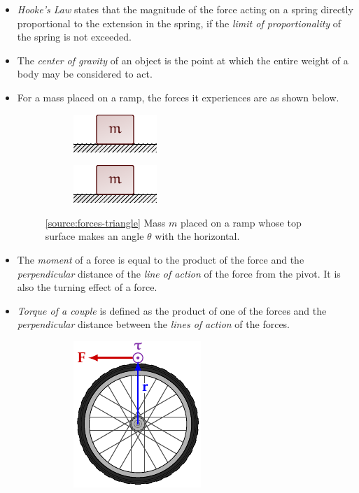 \documentclass[oneside]{book}
\begin{document}
\begin{itemize}
    \item \emph{Hooke's Law} states that the magnitude of the force acting on a spring directly proportional to the extension in the spring, if the \emph{limit of proportionality} of the spring is not exceeded.
    \item The \emph{center of gravity} of an object is the point at which the entire weight of a body may be considered to act.
    \item For a mass placed on a ramp, the forces it experiences are as shown below.
    \begin{figure}[H]
        \centering
        \begin{subfigure}[c]{0.3\textwidth}
            \centering
            \includegraphics[page=4]{../images/Force-Triangle/Force-Triangle.pdf}
        \end{subfigure}%
        \begin{subfigure}[c]{0.3\textwidth}
            \centering
            \includegraphics[page=5]{../images/Force-Triangle/Force-Triangle.pdf}
        \end{subfigure}%
        \caption{\ref{source:forces-triangle} Mass \(m\) placed on a ramp whose top surface makes an angle \(\theta\) with the horizontal.}
        \label{fig:forces-triangle}
    \end{figure}
    \item The \emph{moment} of a force is equal to the product of the force and the \emph{perpendicular} distance of the \emph{line of action} of the force from the pivot. It is also the turning effect of a force.
    \item \emph{Torque of a couple} is defined as the product of one of the forces and the \emph{perpendicular} distance between the \emph{lines of action} of the forces.
    \begin{figure}[H]
        \centering
        \begin{subfigure}[c]{0.3\textwidth}
            \centering
            \includegraphics[page=1]{../images/torque/torque.pdf}

\end{subfigure}
\end{figure}
\end{itemize}
\end{document}
